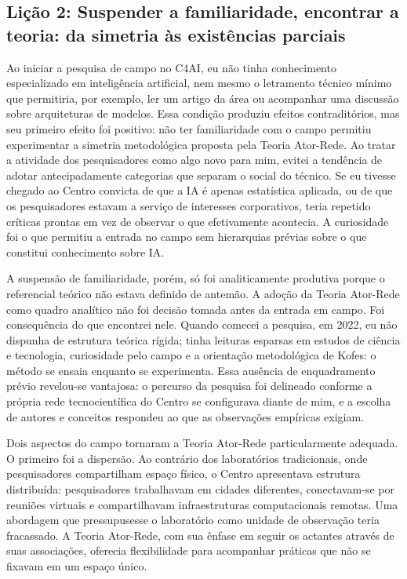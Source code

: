\subsection{Lição 2: Suspender a familiaridade, encontrar a teoria: da simetria às existências parciais}
\label{subsec:licao2}

Ao iniciar a pesquisa de campo no C4AI, eu não tinha conhecimento especializado em inteligência artificial, nem mesmo o letramento técnico mínimo que permitiria, por exemplo, ler um artigo da área ou acompanhar uma discussão sobre arquiteturas de modelos. Essa condição produziu efeitos contraditórios, mas seu primeiro efeito foi positivo: não ter familiaridade com o campo permitiu experimentar a simetria metodológica proposta pela Teoria Ator-Rede. Ao tratar a atividade dos pesquisadores como algo novo para mim, evitei a tendência de adotar antecipadamente categorias que separam o social do técnico. Se eu tivesse chegado ao Centro convicta de que a IA é apenas estatística aplicada, ou de que os pesquisadores estavam a serviço de interesses corporativos, teria repetido críticas prontas em vez de observar o que efetivamente acontecia. A curiosidade foi o que permitiu a entrada no campo sem hierarquias prévias sobre o que constitui conhecimento sobre IA.

A suspensão de familiaridade, porém, só foi analiticamente produtiva porque o referencial teórico não estava definido de antemão. A adoção da Teoria Ator-Rede como quadro analítico não foi decisão tomada antes da entrada em campo. Foi consequência do que encontrei nele. Quando comecei a pesquisa, em 2022, eu não dispunha de estrutura teórica rígida; tinha leituras esparsas em estudos de ciência e tecnologia, curiosidade pelo campo e a orientação metodológica de Kofes: o método se ensaia enquanto se experimenta. Essa ausência de enquadramento prévio revelou-se vantajosa: o percurso da pesquisa foi delineado conforme a própria rede tecnocientífica do Centro se configurava diante de mim, e a escolha de autores e conceitos respondeu ao que as observações empíricas exigiam.

Dois aspectos do campo tornaram a Teoria Ator-Rede particularmente adequada. O primeiro foi a dispersão. Ao contrário dos laboratórios tradicionais, onde pesquisadores compartilham espaço físico, o Centro apresentava estrutura distribuída: pesquisadores trabalhavam em cidades diferentes, conectavam-se por reuniões virtuais e compartilhavam infraestruturas computacionais remotas. Uma abordagem que pressupusesse o laboratório como unidade de observação teria fracassado. A Teoria Ator-Rede, com sua ênfase em seguir os actantes através de suas associações, oferecia flexibilidade para acompanhar práticas que não se fixavam em um espaço único.


